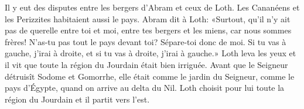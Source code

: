 Il y eut des disputes entre les bergers d’Abram et ceux de Loth.
	Les Cananéens et les Perizzites habitaient aussi le pays.
Abram dit à Loth:
	«Surtout, qu’il n’y ait pas de querelle entre toi et moi,
	entre tes bergers et les miens, car nous sommes frères!
N’as-tu pas tout le pays devant toi? Sépare-toi donc de moi.
	Si tu vas à gauche, j’irai à droite,
	et si tu vas à droite, j’irai à gauche.»
Loth leva les yeux
	et il vit que toute la région du Jourdain était bien irriguée.
Avant que le Seigneur détruisît Sodome et Gomorrhe,
	elle était comme le jardin du Seigneur,
	comme le pays d’Égypte, quand on arrive au delta du Nil.
Loth choisit pour lui toute la région du Jourdain et il partit vers l’est.

